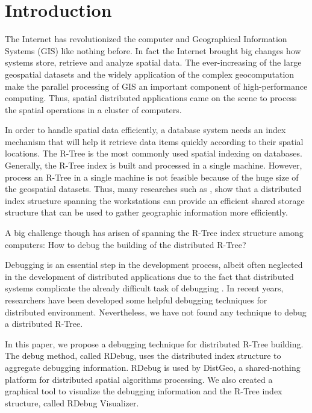 \section{Introduction}
\label{sec:intro}

The Internet has revolutionized the computer and Geographical Information Systems (GIS) like nothing before. In fact the Internet brought big changes how systems store, retrieve and analyze spatial data. 
The ever-increasing of the large geospatial datasets and the widely application of the complex geocomputation make the parallel processing of GIS an important component of high-performance computing. 
Thus, spatial distributed applications came on the scene to process the spatial operations in a cluster of computers.

In order to handle spatial data efficiently, a database system needs an index mechanism that will help it retrieve data items quickly according to their spatial locations. 
The R-Tree is the most commonly used spatial indexing on databases. Generally, the R-Tree index is built and processed in a single machine. 
However, process an R-Tree in a single machine is not feasible because of the huge size of the geospatial datasets. 
Thus, many researches such as  \cite{an1999storing,dedsi,zhong2012towards}, 
show that a distributed index structure spanning the workstations can provide an efficient shared storage structure that can be used to gather geographic information more efficiently.

A big challenge though has arisen of spanning the R-Tree index structure among computers: How to debug the building of the distributed R-Tree? 

Debugging is an essential step in the development process, albeit often neglected in the development of distributed applications due to the fact that distributed systems complicate the already difficult task of debugging \cite{cheung1990Framework}.
In recent years, researchers have been developed some helpful debugging techniques for distributed environment. Nevertheless, we have not found any technique to debug a distributed R-Tree. 

In this paper, we propose a debugging technique for distributed R-Tree building. The debug method, called RDebug, uses the distributed index structure to aggregate debugging information. 
RDebug is used by DistGeo, a shared-nothing platform for distributed spatial algorithms processing. 
We also created a graphical tool to visualize the debugging information and the R-Tree index structure, called RDebug Visualizer. 

